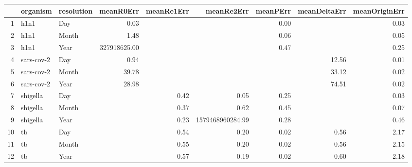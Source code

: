 \begin{table}[ht]
\centering
\begin{tabular}{rllrrrrrr}
  \hline
 & organism & resolution & meanR0Err & meanRe1Err & meanRe2Err & meanPErr & meanDeltaErr & meanOriginErr \\ 
  \hline
1 & h1n1 & Day & 0.03 &  &  & 0.00 &  & 0.03 \\ 
  2 & h1n1 & Month & 1.48 &  &  & 0.06 &  & 0.05 \\ 
  3 & h1n1 & Year & 327918625.00 &  &  & 0.47 &  & 0.25 \\ 
  4 & sars-cov-2 & Day & 0.94 &  &  &  & 12.56 & 0.01 \\ 
  5 & sars-cov-2 & Month & 39.78 &  &  &  & 33.12 & 0.02 \\ 
  6 & sars-cov-2 & Year & 28.98 &  &  &  & 74.51 & 0.02 \\ 
  7 & shigella & Day &  & 0.42 & 0.05 & 0.25 &  & 0.03 \\ 
  8 & shigella & Month &  & 0.37 & 0.62 & 0.45 &  & 0.07 \\ 
  9 & shigella & Year &  & 0.23 & 1579468960284.99 & 0.28 &  & 0.46 \\ 
  10 & tb & Day &  & 0.54 & 0.20 & 0.02 & 0.56 & 2.17 \\ 
  11 & tb & Month &  & 0.55 & 0.20 & 0.02 & 0.56 & 2.15 \\ 
  12 & tb & Year &  & 0.57 & 0.19 & 0.02 & 0.60 & 2.18 \\ 
   \hline
\end{tabular}
\end{table}
